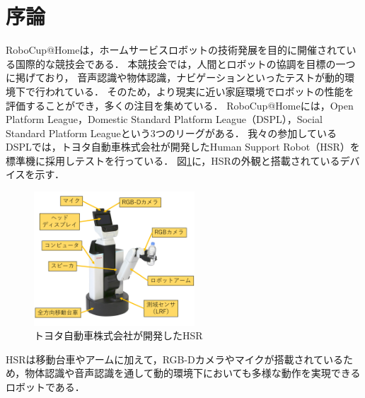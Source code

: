 \documentclass[a4j]{jarticle}
\begin{document}
\maketitle
\thispagestyle{empty}


\section{序論}
RoboCup@Home\cite{robocup_hp}は，ホームサービスロボットの技術発展を目的に開催されている国際的な競技会である．
本競技会では，人間とロボットの協調を目標の一つに掲げており，
音声認識や物体認識，ナビゲーションといったテストが動的環境下で行われている．
そのため，より現実に近い家庭環境でロボットの性能を評価することができ，多くの注目を集めている．
RoboCup@Homeには，Open Platform League，Domestic Standard Platform League（DSPL），Social Standard Platform Leagueという3つのリーグがある．
我々の参加しているDSPLでは，トヨタ自動車株式会社が開発したHuman Support Robot（HSR）\cite{hsr_paper}を標準機に採用しテストを行っている．
図\ref{overview_hsr}に，HSRの外観と搭載されているデバイスを示す．
\begin{figure}[ht]
  \centering
  \includegraphics[width=6cm]{images/hsr/hsr_explain_ja.png}
  \caption{トヨタ自動車株式会社が開発したHSR}
  \label{overview_hsr}
\end{figure}
HSRは移動台車やアームに加えて，RGB-Dカメラやマイクが搭載されているため，物体認識や音声認識を通して動的環境下においても多様な動作を実現できるロボットである．
\end{document}
